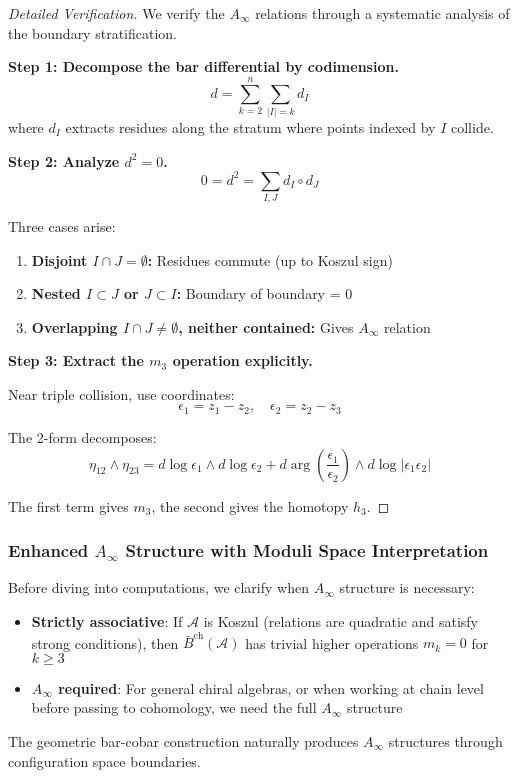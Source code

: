 \begin{proof}[Detailed Verification]
We verify the $A_\infty$ relations through a systematic analysis of the boundary stratification.

\textbf{Step 1: Decompose the bar differential by codimension.}
$$d = \sum_{k=2}^n \sum_{|I|=k} d_I$$
where $d_I$ extracts residues along the stratum where points indexed by $I$ collide.

\textbf{Step 2: Analyze $d^2 = 0$.}
$$0 = d^2 = \sum_{I,J} d_I \circ d_J$$

Three cases arise:
\begin{enumerate}
\item \textbf{Disjoint $I \cap J = \emptyset$:} Residues commute (up to Koszul sign)
\item \textbf{Nested $I \subset J$ or $J \subset I$:} Boundary of boundary = 0
\item \textbf{Overlapping $I \cap J \neq \emptyset$, neither contained:} Gives $A_\infty$ relation
\end{enumerate}

\textbf{Step 3: Extract the $m_3$ operation explicitly.}

Near triple collision, use coordinates:
$$\epsilon_1 = z_1 - z_2, \quad \epsilon_2 = z_2 - z_3$$

The 2-form decomposes:
$$\eta_{12} \wedge \eta_{23} = d\log\epsilon_1 \wedge d\log\epsilon_2 + d\arg\left(\frac{\epsilon_1}{\epsilon_2}\right) \wedge d\log|\epsilon_1\epsilon_2|$$

The first term gives $m_3$, the second gives the homotopy $h_3$.
\end{proof}
\subsubsection{Enhanced $A_\infty$ Structure with Moduli Space Interpretation}

\begin{remark}
Before diving into computations, we clarify when $A_\infty$ structure is necessary:
\begin{itemize}
\item \textbf{Strictly associative}: If $\mathcal{A}$ is Koszul (relations are 
quadratic and satisfy strong conditions), then $\bar{B}^{\text{ch}}(\mathcal{A})$ 
has trivial higher operations $m_k = 0$ for $k \geq 3$
\item \textbf{$A_\infty$ required}: For general chiral algebras, or when working 
at chain level before passing to cohomology, we need the full $A_\infty$ structure
\end{itemize}
The geometric bar-cobar construction naturally produces $A_\infty$ structures 
through configuration space boundaries.
\end{remark}

